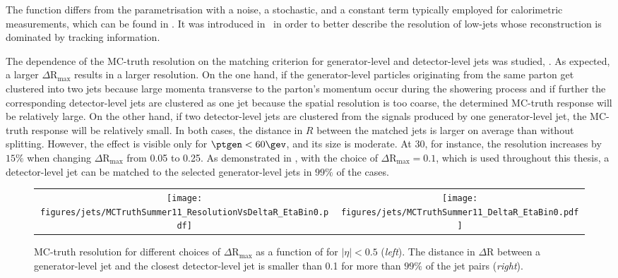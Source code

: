 The function  differs from the parametrisation with a noise, a stochastic, and a constant term typically employed for calorimetric measurements, which can be found \eg in \addref.
It was introduced in~\cite{1748-0221-6-11-P11002} in order to better describe the resolution of low-\ptgen jets whose reconstruction is dominated by tracking information.

The dependence of the MC-truth resolution on the matching criterion for generator-level and detector-level jets was studied, \cf {}.
As expected, a larger $\Delta\text{R}_{\text{max}}$ results in a larger resolution.
On the one hand, if the generator-level particles originating from the same parton get clustered into two jets because large momenta transverse to the parton's momentum occur during the showering process and if further the corresponding detector-level jets are clustered as one jet because the spatial resolution is too coarse, the determined MC-truth response will be relatively large.
On the other hand, if two detector-level jets are clustered from the signals produced by one generator-level jet, the MC-truth response will be relatively small.
In both cases, the distance in $R$ between the matched jets is larger on average than without splitting.
However, the effect is visible only for \mbox{$\ptgen < 60\gev$}, and its size is moderate.
At 30\gev, for instance, the resolution increases by $15\%$ when changing $\Delta\text{R}_{\text{max}}$ from 0.05 to 0.25.
As demonstrated in , with the choice of \mbox{$\Delta\text{R}_{\text{max}} = 0.1$}, which is used throughout this thesis, a detector-level jet can be matched to the selected generator-level jets in $99\%$ of the cases.
\begin{figure}[!ht]
  \centering
  \begin{tabular}{cc}
    \texttt{[image: figures/jets/MCTruthSummer11\_ResolutionVsDeltaR\_EtaBin0.pdf]} &
    \texttt{[image: figures/jets/MCTruthSummer11\_DeltaR\_EtaBin0.pdf]} \\
  \end{tabular}
  \caption{MC-truth resolution for different choices of $\Delta\text{R}_{\text{max}}$ as a function of \ptgen for \mbox{$|\eta| < 0.5$} (\textit{left}).
    The distance in $\Delta\text{R}$ between a generator-level jet and the closest detector-level jet is smaller than 0.1 for more than $99\%$ of the jet pairs (\textit{right}).
  }
  \label{fig:Jets:Resolution:MCTruth:DeltaR}
\end{figure}

